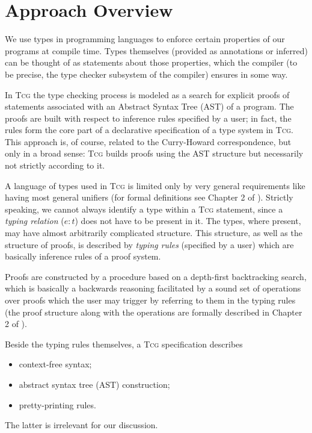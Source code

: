\documentclass[a4paper,12pt]{article}
\newcommand{\Tcg}{\textsc{Tcg}}
\begin{document}
\section{Approach Overview}

We use types in programming languages to enforce certain properties of our programs at compile time. Types themselves (provided as annotations or inferred) can be thought of as statements about those properties, which the compiler (to be precise, the type checker subsystem of the compiler) ensures in some way.

In \Tcg{} the type checking process is modeled as a search for explicit proofs of statements associated with an Abstract Syntax Tree (AST) of a program. The proofs are built with respect to inference rules specified by a user; in fact, the rules form the core part of a declarative specification of a type system in \Tcg{}. This approach is, of course, related to the Curry-Howard correspondence, but only in a broad sense: \Tcg{} builds proofs using the AST structure but necessarily not strictly according to it. 

A language of types used in \Tcg{} is limited only by very general requirements like having most general unifiers (for formal definitions see Chapter 2 of \cite{Tcg}). Strictly speaking, we cannot always identify a type within a \Tcg{} statement, since a \emph{typing relation} ($e : t$) does not have to be present in it. The types, where present, may have almost arbitrarily complicated structure. This structure, as well as the structure of proofs, is described by \emph{typing rules} (specified by a user) which are basically inference rules of a proof system. 

Proofs are constructed by a procedure based on a depth-first backtracking search, which is basically a backwards reasoning facilitated by a sound set of operations over proofs which the user may trigger by referring to them in the typing rules (the proof structure along with the operations are formally described in Chapter 2 of \cite{Tcg}).

Beside the typing rules themselves, a \Tcg{} specification describes
\begin{itemize}
	\item context-free syntax;
	\item abstract syntax tree (AST) construction;
	\item pretty-printing rules.
\end{itemize}
The latter is irrelevant for our discussion.
\end{document}
